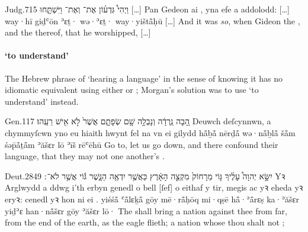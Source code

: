 \begin{example}{Judg.}{7}{15}{}{}
	\quoling
	{וַיְהִי֩  גִּדְע֜וֹן אֶת־ וְאֶת־ וַיִּשְׁתָּ֑חוּ […]}%
	{Pan  Gedeon  ai , yna efe a addolodd: […]} %
	{way·hī  giḏʿōn ʾɛṯ· wə·ʾɛṯ· way·yištå̄ḥū […]}%
	{And it was \textit{so}, when Gideon  the , and the  thereof, that he worshipped, […]}%
\end{example}



\paragraph[\C{deall}]{ ‘to understand’}

\begin{paper}
	The Hebrew phrase of ‘hearing a language’ in the sense of knowing it has no idiomatic equivalent using either  or ; Morgan’s solution was to use  ‘to understand’ instead.
\end{paper}

\begin{example}{Gen.}{11}{7}{}{}
	\quoling
	{הָ֚בָה נֵֽרְדָ֔ה וְנָבְלָ֥ה שָׁ֖ם שְׂפָתָ֑ם אֲשֶׁר֙ לֹ֣א  אִ֖ישׁ  רֵעֵֽהוּ׃}
	{Deuwch deſcynnwn, a chymmyſcwn yno eu hiaith hwynt fel na  vn  ei gilydd}
	{hå̄ḇå̄ nērḏå̄ wə·nå̄ḇlå̄ šå̄m śəp̄å̄ṯå̄m ʾăšɛr lō  ʾīš  rēʿēhū}
	{Go to, let us go down, and there confound their language, that they may not  one another’s .}
\end{example}

\begin{example}{Deut.}{28}{49}{}{}
	\quoling
	{יִשָּׂ֣א יְהוָה֩ עָלֶ֨יךָ גּ֤וֹי מֵרָחוֹק֙ מִקְצֵ֣ה הָאָ֔רֶץ כַּאֲשֶׁ֥ר יִדְאֶ֖ה הַנָּ֑שֶׁר גּ֕וֹי אֲשֶׁ֥ר לֹא־ ׃}
	{Yꝛ Arglwydd a ddwg i’th erbyn genedl o bell [ſef] o eithaf y tir, megis ac yꝛ eheda yꝛ eryꝛ: cenedl yꝛ hon ni  ei .}
	{yiśśå̄ {\YHWH} ʿå̄lɛḵå̄ gōy mē·rå̄ḥōq mi·qṣē hå̄·ʾå̄rɛṣ ka·ʾăšɛr yiḏʾɛ han·nå̄šɛr gōy ʾăšɛr lō· }
	{The {\LORD} shall bring a nation against thee from far, from the end of the earth,  as the eagle flieth; a nation whose  thou shalt not ;}
\end{example}

